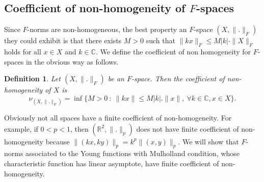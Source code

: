 \documentclass[pdflatex,sn-mathphys-num]{sn-jnl}%
\newtheorem{definition}{Definition}
\theoremstyle{thmstyleone}%
\theoremstyle{thmstyletwo}%
\theoremstyle{thmstylethree}%
\begin{document}
	\subsection{Coefficient of non-homogeneity of $F$-spaces}
	Since $F$-norms are non-homogeneous, the best property an $F$-space $(X,\|.\|_F)$ they could exhibit is that there exists $M>0$ such that $\|kx\|_F\leq M|k|\cdot \|X\|_F$  holds for all $x\in X$ and $k\in \mathbb C$. We define the coefficient of non homogeneity for $F$-spaces in the obvious way as follows.
	\begin{definition}
		Let $(X,\|.\|_F)$ be an $F$-space. Then the coefficient of non-homogeneity of $X$ is $$\nu_{(X,\|.\|_F)}=\inf\{M>0~:~\|kx\|\leq M|k|.\|x\|,~\forall k\in \mathbb C, x\in X\}.$$
	\end{definition}
	Obviously not all spaces have a finite coefficient of non-homogeneity. For example, if $0<p<1$, then $(\mathbb R^2,\|.\|_p)$ does not have finite coefficient of non-homogeneity because $\|(kx,ky)\|_p=k^p\|(x,y)\|_p$. We will show that $F$-norms associated to the Young functions with Mulholland condition, whose characteristic function has linear asymptote, have finite coefficient of non-homogeneity.\\
	
\end{document}

